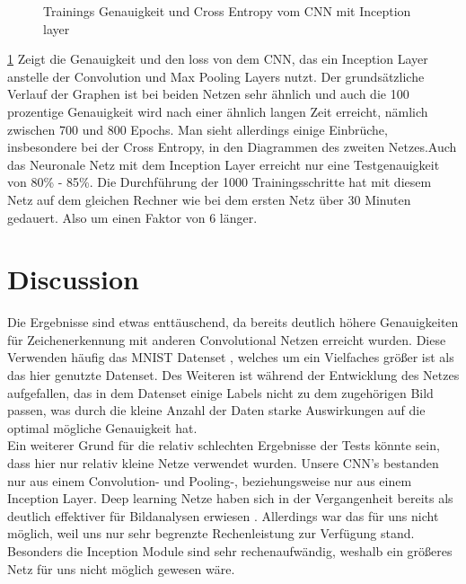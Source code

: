 \documentclass[runningheads,a4paper]{llncs}[2015/06/24]
\begin{document}
\begin{figure}
	\caption{Trainings Genauigkeit und Cross Entropy vom CNN mit Inception layer}
	\label{fig:inception_result_graph}
\end{figure}
\cref{fig:inception_result_graph} Zeigt die Genauigkeit und den loss von dem CNN, das ein Inception Layer anstelle der Convolution und Max Pooling Layers nutzt. Der grundsätzliche Verlauf der Graphen ist bei beiden Netzen sehr ähnlich und auch die 100 prozentige Genauigkeit wird nach einer ähnlich langen Zeit erreicht, nämlich zwischen 700 und 800 Epochs. Man sieht allerdings einige Einbrüche, insbesondere bei der Cross Entropy, in den Diagrammen des zweiten Netzes.Auch das Neuronale Netz mit dem Inception Layer erreicht nur eine Testgenauigkeit von 80\% - 85\%. Die Durchführung der 1000 Trainingsschritte hat mit diesem Netz auf dem gleichen Rechner wie bei dem ersten Netz über 30 Minuten gedauert. Also um einen Faktor von 6 länger.

\section{Discussion}\label{sec:Discussion}
Die Ergebnisse sind etwas enttäuschend, da bereits deutlich höhere Genauigkeiten für Zeichenerkennung mit anderen Convolutional Netzen erreicht wurden. Diese Verwenden häufig das MNIST Datenset \cite{mnist}, welches um ein Vielfaches größer ist als das hier genutzte Datenset. Des Weiteren ist während der Entwicklung des Netzes aufgefallen, das in dem Datenset einige Labels nicht zu dem zugehörigen Bild passen, was durch die kleine Anzahl der Daten starke Auswirkungen auf die optimal mögliche Genauigkeit hat.\\
Ein weiterer Grund für die relativ schlechten Ergebnisse der Tests könnte sein, dass hier nur relativ kleine Netze verwendet wurden. Unsere CNN's bestanden nur aus einem Convolution- und Pooling-, beziehungsweise nur aus einem Inception Layer. Deep learning Netze haben sich in der Vergangenheit bereits als deutlich effektiver für Bildanalysen erwiesen \cite{deep_conv}. Allerdings war das für uns nicht möglich, weil uns nur sehr begrenzte Rechenleistung zur Verfügung stand. Besonders die Inception Module sind sehr rechenaufwändig, weshalb ein größeres Netz für uns nicht möglich gewesen wäre.\\
\end{document}
